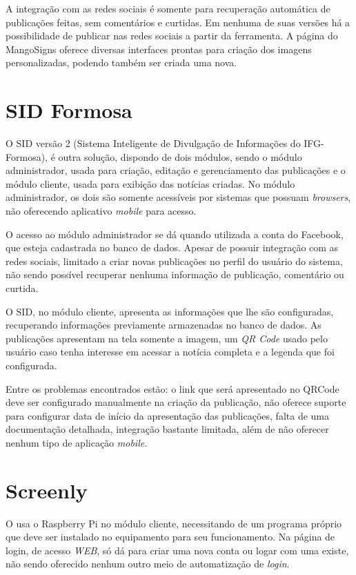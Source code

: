 A integração com as redes sociais é somente para recuperação automática de publicações feitas, sem comentários e curtidas. Em nenhuma de suas versões há a possibilidade de publicar nas redes sociais a partir da ferramenta. A página do MangoSigns oferece diversas interfaces prontas para criação dos imagens personalizadas, podendo também ser criada uma nova. 

\section{SID Formosa}
\label{sec:sid}
O SID versão 2 (Sistema Inteligente de Divulgação de Informações do IFG-Formosa), é outra solução, dispondo de dois módulos, sendo o módulo administrador, usada para criação, editação e gerenciamento das publicações e o módulo cliente, usada para exibição das notícias criadas. No módulo administrador, os dois são somente acessíveis por sistemas que possuam \textit{browsers}, não oferecendo aplicativo \textit{mobile} para acesso.

O acesso ao módulo administrador se dá quando utilizada a conta do Facebook, que esteja cadastrada no banco de dados. Apesar de possuir integração com as redes sociais, limitado a criar novas publicações no perfil do usuário do sistema, não sendo possível recuperar nenhuma informação de publicação, comentário ou curtida.

O SID, no módulo cliente, apresenta as informações que lhe são configuradas, recuperando informações previamente armazenadas no banco de dados. As publicações apresentam na tela somente a imagem, um \textit{QR Code} usado pelo usuário caso tenha interesse em acessar a notícia completa e a legenda que foi configurada. \cite{sobrinho2017}

Entre os problemas encontrados estão: o link que será apresentado no QRCode deve ser configurado manualmente na criação da publicação, não oferece suporte para configurar data de início da apresentação das publicações, falta de uma documentação detalhada, integração bastante limitada, além de não oferecer nenhum tipo de aplicação \textit{mobile}.

\section{Screenly}
O \cite{screenly2017} usa o Raspberry Pi no módulo cliente, necessitando de um programa próprio que deve ser instalado no equipamento para seu funcionamento. Na página de login, de acesso \textit{WEB}, só dá para criar uma nova conta ou logar com uma existe, não sendo oferecido nenhum outro meio de automatização de \textit{login}. 

